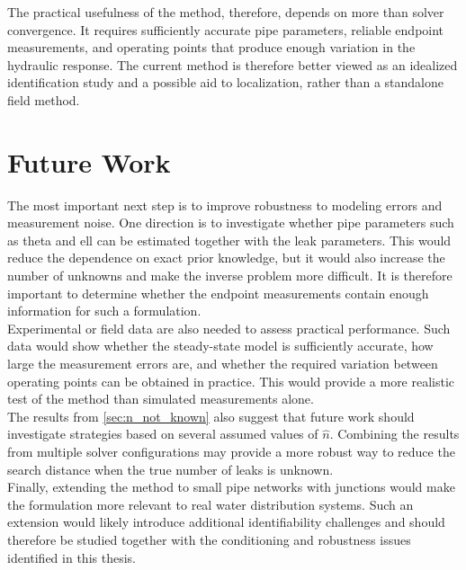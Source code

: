The practical usefulness of the method, therefore, depends on more than solver convergence. It requires sufficiently accurate pipe parameters, reliable endpoint measurements, and operating points that produce enough variation in the hydraulic response. The current method is therefore better viewed as an idealized identification study and a possible aid to localization, rather than a standalone field method.

\section{Future Work}

The most important next step is to improve robustness to modeling errors and measurement noise. One direction is to investigate whether pipe parameters such as \gls{theta} and \gls{ell} can be estimated together with the leak parameters. This would reduce the dependence on exact prior knowledge, but it would also increase the number of unknowns and make the inverse problem more difficult. It is therefore important to determine whether the endpoint measurements contain enough information for such a formulation.\\

Experimental or field data are also needed to assess practical performance. Such data would show whether the steady-state model is sufficiently accurate, how large the measurement errors are, and whether the required variation between operating points can be obtained in practice. This would provide a more realistic test of the method than simulated measurements alone.\\

The results from \autoref{sec:n_not_known} also suggest that future work should investigate strategies based on several assumed values of $\hat n$. Combining the results from multiple solver configurations may provide a more robust way to reduce the search distance when the true number of leaks is unknown.\\

Finally, extending the method to small pipe networks with junctions would make the formulation more relevant to real water distribution systems. Such an extension would likely introduce additional identifiability challenges and should therefore be studied together with the conditioning and robustness issues identified in this thesis.
